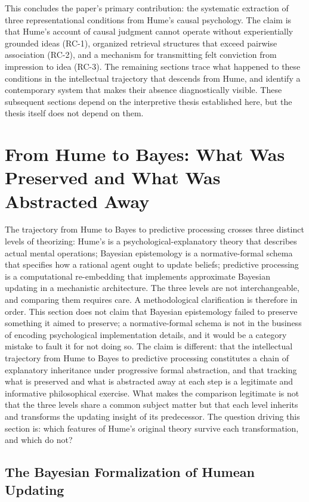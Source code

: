 \documentclass[11pt]{article}
\begin{document}
This concludes the paper's primary contribution: the systematic extraction of three representational conditions from Hume's causal psychology. The claim is that Hume's account of causal judgment cannot operate without experientially grounded ideas (RC-1), organized retrieval structures that exceed pairwise association (RC-2), and a mechanism for transmitting felt conviction from impression to idea (RC-3). The remaining sections trace what happened to these conditions in the intellectual trajectory that descends from Hume, and identify a contemporary system that makes their absence diagnostically visible. These subsequent sections depend on the interpretive thesis established here, but the thesis itself does not depend on them.

\section{From Hume to Bayes: What Was Preserved and What Was Abstracted Away}

The trajectory from Hume to Bayes to predictive processing crosses three distinct levels of theorizing: Hume's is a psychological-explanatory theory that describes actual mental operations; Bayesian epistemology is a normative-formal schema that specifies how a rational agent ought to update beliefs; predictive processing is a computational re-embedding that implements approximate Bayesian updating in a mechanistic architecture. The three levels are not interchangeable, and comparing them requires care. A methodological clarification is therefore in order. This section does not claim that Bayesian epistemology failed to preserve something it aimed to preserve; a normative-formal schema is not in the business of encoding psychological implementation details, and it would be a category mistake to fault it for not doing so. The claim is different: that the intellectual trajectory from Hume to Bayes to predictive processing constitutes a chain of explanatory inheritance under progressive formal abstraction, and that tracking what is preserved and what is abstracted away at each step is a legitimate and informative philosophical exercise. What makes the comparison legitimate is not that the three levels share a common subject matter but that each level inherits and transforms the updating insight of its predecessor. The question driving this section is: which features of Hume's original theory survive each transformation, and which do not?

\subsection{The Bayesian Formalization of Humean Updating}
\end{document}
